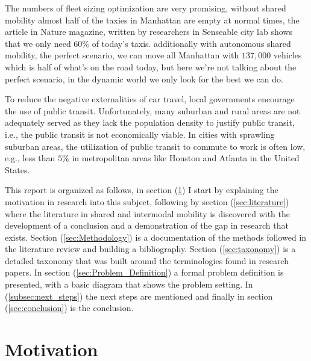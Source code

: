\documentclass{article}
\begin{document}
The numbers of fleet sizing optimization are very promising, without shared mobility almost half of the taxies in Manhattan are empty at normal times, the article in Nature magazine, written by researchers in Senseable city lab\cite{senseable_city_lab} shows that we only need $60\%$ of today\rq{s} taxis. additionally with autonomous shared mobility, the perfect scenario, we can move all Manhattan with $137,000$ vehicles which is half of what\rq{s} on the road today, but here we\rq{re} not talking about the perfect scenario, in the dynamic world we only look for the best we can do. \cite{senseable_city_lab} 

To reduce the negative externalities of car travel, local governments encourage the use of public transit. Unfortunately, many suburban and rural areas are not adequately served as they lack the population density to justify public transit, i.e., the public transit is not economically viable. In cities with sprawling suburban areas, the utilization of public transit to commute to work is often low, e.g., less than $5\%$ in metropolitan areas like Houston and Atlanta in the United States.\cite{STIGLIC201812}


This report is organized as follows, in section (\ref{sec:Motivation}) I start by explaining the motivation in research into this subject, following by section (\ref{sec:literature}) where the literature in shared and intermodal mobility is discovered with the development of a conclusion and a demonstration of the gap in research that exists. Section (\ref{sec:Methodology}) is a documentation of the methods followed in the literature review and building a bibliography. Section (\ref{sec:taxonomy}) is a detailed taxonomy that was built around the 
terminologies found in research papers. In section (\ref{sec:Problem_Definition}) a formal problem definition is presented, with a basic diagram that shows the problem setting. In (\ref{subsec:next_steps}) the next steps are mentioned and finally in section (\ref{sec:conclusion}) is the conclusion.


\section{Motivation}
\label{sec:Motivation}

\end{document}
